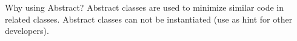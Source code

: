 \begin{frame}{Why using Abstract?}
	Abstract classes are used to minimize similar code in related classes.
	Abstract classes can not be instantiated (use as hint for other developers).
\end{frame}

%


